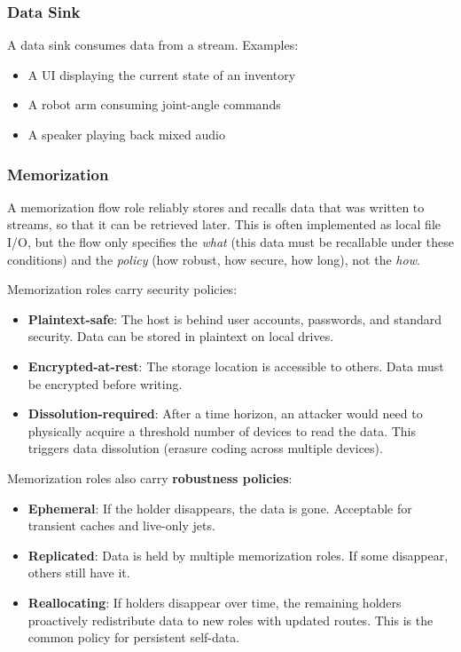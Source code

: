 \documentclass[11pt, letterpaper]{article}
\begin{document}
\subsubsection{Data Sink}

A data sink consumes data from a stream. Examples:
\begin{itemize}[leftmargin=2em]
  \item A UI displaying the current state of an inventory
  \item A robot arm consuming joint-angle commands
  \item A speaker playing back mixed audio
\end{itemize}

\subsubsection{Memorization}

A memorization flow role reliably stores and recalls data that was written to streams, so
that it can be retrieved later. This is often implemented as local file I/O, but the
flow only specifies the \emph{what} (this data must be recallable under these
conditions) and the \emph{policy} (how robust, how secure, how long), not the
\emph{how}.

Memorization roles carry security policies:
\begin{itemize}[leftmargin=2em]
  \item \textbf{Plaintext-safe}: The host is behind user accounts, passwords, and
    standard security. Data can be stored in plaintext on local drives.
  \item \textbf{Encrypted-at-rest}: The storage location is accessible to others.
    Data must be encrypted before writing.
  \item \textbf{Dissolution-required}: After a time horizon, an attacker would need
    to physically acquire a threshold number of devices to read the data. This triggers
    data dissolution (erasure coding across multiple devices).
\end{itemize}

Memorization roles also carry \textbf{robustness policies}:
\begin{itemize}[leftmargin=2em]
  \item \textbf{Ephemeral}: If the holder disappears, the data is gone. Acceptable for
    transient caches and live-only jets.
  \item \textbf{Replicated}: Data is held by multiple memorization roles. If some
    disappear, others still have it.
  \item \textbf{Reallocating}: If holders disappear over time, the remaining holders
    proactively redistribute data to new roles with updated routes. This is the common
    policy for persistent self-data.
\end{itemize}
\end{document}
